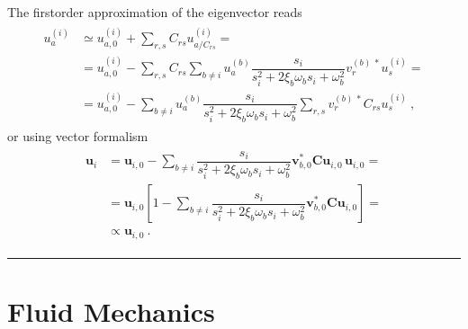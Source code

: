 \documentclass[letterpaper,10pt,english]{jupyterBook}
\begin{document}
\sphinxAtStartPar
The first\sphinxhyphen{}order approximation of the eigenvector reads
\begin{equation*}
\begin{split}\begin{aligned}
  u^{(i)}_a 
  & \simeq u^{(i)}_{a,0} + \sum_{r,s} C_{rs} u^{(i)}_{a/C_{rs}} = \\
  &      = u^{(i)}_{a,0} - \sum_{r,s} C_{rs} \sum_{b \ne i} u_a^{(b)} \dfrac{s_i}{s_i^2 + 2 \xi_b \omega_b s_i + \omega_b^2} v_r^{(b) \ *} u_s^{(i)} = \\
  &      = u^{(i)}_{a,0} - \sum_{b \ne i} u_a^{(b)} \dfrac{s_i}{s_i^2 + 2 \xi_b \omega_b s_i + \omega_b^2} \sum_{r,s} v_r^{(b) \ *} C_{rs} u_s^{(i)} \ ,
\end{aligned}\end{split}
\end{equation*}
\sphinxAtStartPar
or using vector formalism
\begin{equation}\label{equation:ch/solids/structural-damping:eq:damping:eigenvectors}
\begin{split}\begin{aligned}
 \mathbf{u}_i
 & = \mathbf{u}_{i,0} - \sum_{b \ne i} \dfrac{s_i}{s_i^2 + 2 \xi_b \omega_b s_i + \omega_b^2} \mathbf{v}_{b,0}^* \mathbf{C} \mathbf{u}_{i,0} \, \mathbf{u}_{i,0} = \\
 & = \mathbf{u}_{i,0} \left[ 1 - \sum_{b \ne i} \dfrac{s_i}{s_i^2 + 2 \xi_b \omega_b s_i + \omega_b^2} \mathbf{v}_{b,0}^* \mathbf{C} \mathbf{u}_{i,0} \right] = \\
 & \propto \mathbf{u}_{i,0} \ .
\end{aligned}\end{split}
\end{equation}

\bigskip\hrule\bigskip


\sphinxstepscope


\part{Fluid Mechanics}

\sphinxstepscope
\end{document}
